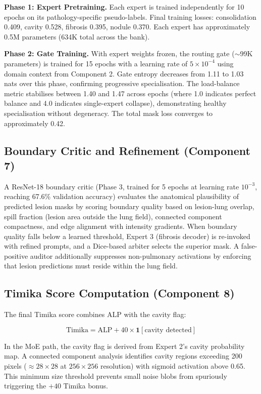 \documentclass{article}
\begin{document}
\textbf{Phase 1: Expert Pretraining.} Each expert is trained independently for 10 epochs on its pathology-specific pseudo-labels. Final training losses: consolidation 0.409, cavity 0.528, fibrosis 0.395, nodule 0.370. Each expert has approximately 0.5M parameters (634K total across the bank).

\textbf{Phase 2: Gate Training.} With expert weights frozen, the routing gate ($\sim$99K parameters) is trained for 15 epochs with a learning rate of $5 \times 10^{-4}$ using domain context from Component 2. Gate entropy decreases from 1.11 to 1.03 nats over this phase, confirming progressive specialisation. The load-balance metric stabilises between 1.40 and 1.47 across epochs (where 1.0 indicates perfect balance and 4.0 indicates single-expert collapse), demonstrating healthy specialisation without degeneracy. The total mask loss converges to approximately 0.42.

\subsection{Boundary Critic and Refinement (Component 7)}

A ResNet-18 \cite{he2016resnet} boundary critic (Phase 3, trained for 5 epochs at learning rate $10^{-3}$, reaching 67.6\% validation accuracy) evaluates the anatomical plausibility of predicted lesion masks by scoring boundary quality based on lesion-lung overlap, spill fraction (lesion area outside the lung field), connected component compactness, and edge alignment with intensity gradients. When boundary quality falls below a learned threshold, Expert 3 (fibrosis decoder) is re-invoked with refined prompts, and a Dice-based arbiter selects the superior mask. A false-positive auditor additionally suppresses non-pulmonary activations by enforcing that lesion predictions must reside within the lung field.

\subsection{Timika Score Computation (Component 8)}

The final Timika score combines ALP with the cavity flag:

\begin{equation}
\text{Timika} = \text{ALP} + 40 \times \mathbf{1}[\text{cavity detected}]
\end{equation}

In the MoE path, the cavity flag is derived from Expert 2's cavity probability map. A connected component analysis identifies cavity regions exceeding 200 pixels ($\approx 28 \times 28$ at $256 \times 256$ resolution) with sigmoid activation above 0.65. This minimum size threshold prevents small noise blobs from spuriously triggering the $+40$ Timika bonus.
\end{document}

